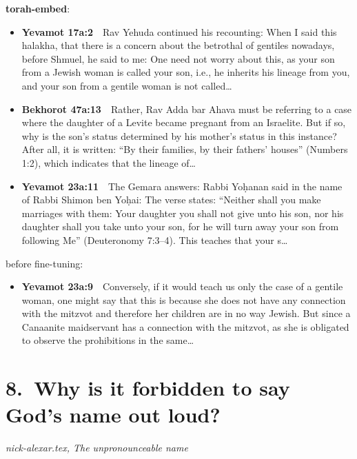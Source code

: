 \documentclass[11pt,a4paper]{article}
\begin{document}
{\color{quiet}\small\textbf{torah-embed}:}
\begin{itemize}[leftmargin=1.2em,itemsep=3pt]
\item {\color{ref}\textbf{Yevamot 17a:2}}\ \ Rav Yehuda continued his recounting: When I said this halakha, that there is a concern about the betrothal of gentiles nowadays, before Shmuel, he said to me: One need not worry about this, as your son from a Jewish woman is called your son, i.e., he inherits his lineage from you, and your son from a gentile woman is not called\ldots
\item {\color{ref}\textbf{Bekhorot 47a:13}}\ \ Rather, Rav Adda bar Ahava must be referring to a case where the daughter of a Levite became pregnant from an Israelite. But if so, why is the son’s status determined by his mother’s status in this instance? After all, it is written: “By their families, by their fathers’ houses” (Numbers 1:2), which indicates that the lineage of\ldots
\item {\color{ref}\textbf{Yevamot 23a:11}}\ \ The Gemara answers: Rabbi Yoḥanan said in the name of Rabbi Shimon ben Yoḥai: The verse states: “Neither shall you make marriages with them: Your daughter you shall not give unto his son, nor his daughter shall you take unto your son, for he will turn away your son from following Me” (Deuteronomy 7:3–4). This teaches that your s\ldots
\end{itemize}
{\color{quiet}\small before fine-tuning:}
\begin{itemize}[leftmargin=1.2em]
\item {\color{ref}\textbf{Yevamot 23a:9}}\ \ Conversely, if it would teach us only the case of a gentile woman, one might say that this is because she does not have any connection with the mitzvot and therefore her children are in no way Jewish. But since a Canaanite maidservant has a connection with the mitzvot, as she is obligated to observe the prohibitions in the same\ldots
\end{itemize}

\section*{8.\ Why is it forbidden to say God's name out loud?}
{\color{quiet}\small\textit{nick-alexar.tex, The unpronounceable name}}
\end{document}
